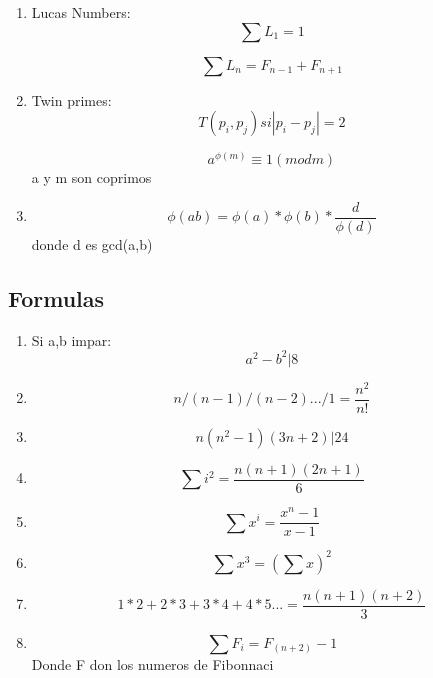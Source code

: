 \begin{enumerate}
\item
Lucas Numbers:
\begin{equation}
    \sum L_1 = 1
\end{equation}

\begin{equation}
    \sum L_n = F_{n-1}+F_{n+1}
\end{equation}

\item
Twin primes:
\begin{equation}
    T(p_i,p_j) si |p_i-p_j|=2
\end{equation}

\begin{equation}
    a^{\phi(m)}\equiv 1(mod m)
\end{equation}
a y m son coprimos

\item
\begin{equation}
    \phi(ab)=\phi(a)*\phi(b)*\frac{d}{\phi(d)}
\end{equation}
donde d es gcd(a,b)

\end{enumerate}

\subsection{Formulas}
\begin{enumerate}
\item
Si a,b impar:
\begin{equation}
   a^2-b^2 |8
\end{equation}
\item
\begin{equation}
  n/(n-1)/(n-2).../1=\frac{n^2}{n!}
\end{equation}
\item
\begin{equation}
    n(n^2-1)(3n+2) | 24
\end{equation}
\item
\begin{equation}
    \sum i^2=\frac{n(n+1)(2n+1)}{6}
\end{equation}
\item
\begin{equation}
    \sum x^i=\frac{x^n-1}{x-1}
\end{equation}
\item
\begin{equation}
    \sum x^3=(\sum x)^2
\end{equation}
\item
\begin{equation}
    1*2+2*3+3*4+4*5...=\frac{n(n+1)(n+2)}{3}
\end{equation}
\item
\begin{equation}
    \sum F_i = F_(n+2)-1
\end{equation}
Donde F don los numeros de Fibonnaci

\end{enumerate}

